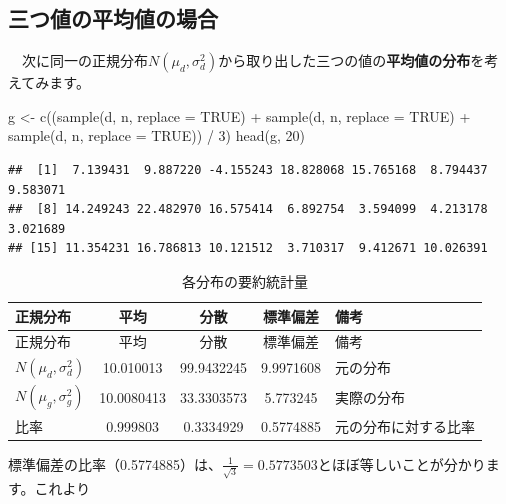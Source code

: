 \documentclass[]{tufte-handout}
\newenvironment{Shaded}{}{}
\newcommand{\AttributeTok}[1]{\textcolor[rgb]{0.49,0.56,0.16}{#1}}
\newcommand{\ConstantTok}[1]{\textcolor[rgb]{0.53,0.00,0.00}{#1}}
\newcommand{\DecValTok}[1]{\textcolor[rgb]{0.25,0.63,0.44}{#1}}
\newcommand{\FunctionTok}[1]{\textcolor[rgb]{0.02,0.16,0.49}{#1}}
\newcommand{\NormalTok}[1]{#1}
\newcommand{\OtherTok}[1]{\textcolor[rgb]{0.00,0.44,0.13}{#1}}
\newcommand{\SpecialCharTok}[1]{\textcolor[rgb]{0.25,0.44,0.63}{#1}}
\begin{document}
\newpage

\hypertarget{ux4e09ux3064ux5024ux306eux5e73ux5747ux5024ux306eux5834ux5408}{%
\subsection{\texorpdfstring{\textbf{三つ値の平均値の場合}}{三つ値の平均値の場合}}\label{ux4e09ux3064ux5024ux306eux5e73ux5747ux5024ux306eux5834ux5408}}

　次に同一の正規分布\(N(\mu_d, \sigma^2_d)\)から取り出した三つの値の\textbf{平均値の分布}を考えてみます。
　

\begin{Shaded}
\begin{Highlighting}[numbers=left,,]
\NormalTok{g }\OtherTok{\textless{}{-}} \FunctionTok{c}\NormalTok{((}\FunctionTok{sample}\NormalTok{(d, n, }\AttributeTok{replace =} \ConstantTok{TRUE}\NormalTok{) }\SpecialCharTok{+} \FunctionTok{sample}\NormalTok{(d, n, }\AttributeTok{replace =} \ConstantTok{TRUE}\NormalTok{) }
        \SpecialCharTok{+} \FunctionTok{sample}\NormalTok{(d, n, }\AttributeTok{replace =} \ConstantTok{TRUE}\NormalTok{)) }\SpecialCharTok{/} \DecValTok{3}\NormalTok{)}
\FunctionTok{head}\NormalTok{(g, }\DecValTok{20}\NormalTok{)}
\end{Highlighting}
\end{Shaded}

\begin{verbatim}
##  [1]  7.139431  9.887220 -4.155243 18.828068 15.765168  8.794437  9.583071
##  [8] 14.249243 22.482970 16.575414  6.892754  3.594099  4.213178  3.021689
## [15] 11.354231 16.786813 10.121512  3.710317  9.412671 10.026391
\end{verbatim}

\begin{longtable}[]{@{}lcccl@{}}
\caption{各分布の要約統計量}\tabularnewline
\toprule
正規分布 & 平均 & 分散 & 標準偏差 & 備考 \\
\midrule
\endfirsthead
\toprule
正規分布 & 平均 & 分散 & 標準偏差 & 備考 \\
\midrule
\endhead
\(N(\mu_d, \sigma^2_d)\) & 10.010013 & 99.9432245 & 9.9971608 &
元の分布 \\
\(N(\mu_g, \sigma^2_g)\) & 10.0080413 & 33.3303573 & 5.773245 &
実際の分布 \\
比率 & 0.999803 & 0.3334929 & 0.5774885 & 元の分布に対する比率 \\
\bottomrule
\end{longtable}

標準偏差の比率（0.5774885）は、\(\frac{1}{\sqrt{3}} = 0.5773503\)とほぼ等しいことが分かります。これより
\end{document}
